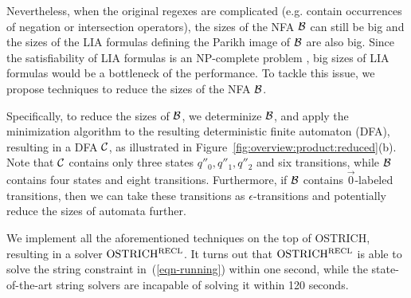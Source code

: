 Nevertheless, when the original regexes are complicated (e.g. contain occurrences of negation or intersection operators), the sizes of the NFA $\mathcal{B}$ can still be big and the sizes of the LIA formulas defining the Parikh image of $\mathcal{B}$ are also big. Since the satisfiability of LIA formulas is an NP-complete problem \cite{Haase18}, big sizes of LIA formulas would be a bottleneck of the performance. 
To tackle this issue, we propose techniques to reduce the sizes of the NFA $\mathcal{B}$.

Specifically, to reduce the sizes of $\mathcal{B}$, we determinize $\mathcal{B}$, and apply the minimization algorithm to the resulting deterministic finite automaton (DFA), resulting in a DFA $\mathcal{C}$, as illustrated in Figure~\ref{fig:overview:product:reduced}(b). 
Note that $\mathcal{C}$ contains only three states $q''_0, q''_1, q''_2$ and six transitions, while $\mathcal{B}$ contains four states and eight transitions. Furthermore, if $\mathcal{B}$ contains $\vec{0}$-labeled transitions, then we can take these transitions as $\epsilon$-transitions and potentially reduce the sizes of automata further. 

We implement all the aforementioned techniques on the top of OSTRICH, resulting in a solver $\rm OSTRICH^{RECL}$. It turns out that $\rm OSTRICH^{RECL}$ is able to solve the string constraint in~(\ref{eqn-running}) within one second, while the state-of-the-art string solvers are incapable of solving it within 120 seconds. 
